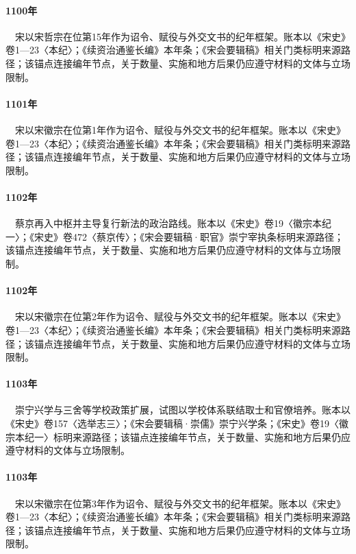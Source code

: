 \paragraph{1100年}　宋以宋哲宗在位第15年作为诏令、赋役与外交文书的纪年框架。账本以《宋史》卷1—23〈本纪〉；《续资治通鉴长编》本年条；《宋会要辑稿》相关门类标明来源路径；该锚点连接编年节点，关于数量、实施和地方后果仍应遵守材料的文体与立场限制。

\paragraph{1101年}　宋以宋徽宗在位第1年作为诏令、赋役与外交文书的纪年框架。账本以《宋史》卷1—23〈本纪〉；《续资治通鉴长编》本年条；《宋会要辑稿》相关门类标明来源路径；该锚点连接编年节点，关于数量、实施和地方后果仍应遵守材料的文体与立场限制。

\paragraph{1102年}　蔡京再入中枢并主导复行新法的政治路线。账本以《宋史》卷19〈徽宗本纪一〉；《宋史》卷472〈蔡京传〉；《宋会要辑稿·职官》崇宁宰执条标明来源路径；该锚点连接编年节点，关于数量、实施和地方后果仍应遵守材料的文体与立场限制。

\paragraph{1102年}　宋以宋徽宗在位第2年作为诏令、赋役与外交文书的纪年框架。账本以《宋史》卷1—23〈本纪〉；《续资治通鉴长编》本年条；《宋会要辑稿》相关门类标明来源路径；该锚点连接编年节点，关于数量、实施和地方后果仍应遵守材料的文体与立场限制。

\paragraph{1103年}　崇宁兴学与三舍等学校政策扩展，试图以学校体系联结取士和官僚培养。账本以《宋史》卷157〈选举志三〉；《宋会要辑稿·崇儒》崇宁兴学条；《宋史》卷19〈徽宗本纪一〉标明来源路径；该锚点连接编年节点，关于数量、实施和地方后果仍应遵守材料的文体与立场限制。

\paragraph{1103年}　宋以宋徽宗在位第3年作为诏令、赋役与外交文书的纪年框架。账本以《宋史》卷1—23〈本纪〉；《续资治通鉴长编》本年条；《宋会要辑稿》相关门类标明来源路径；该锚点连接编年节点，关于数量、实施和地方后果仍应遵守材料的文体与立场限制。

